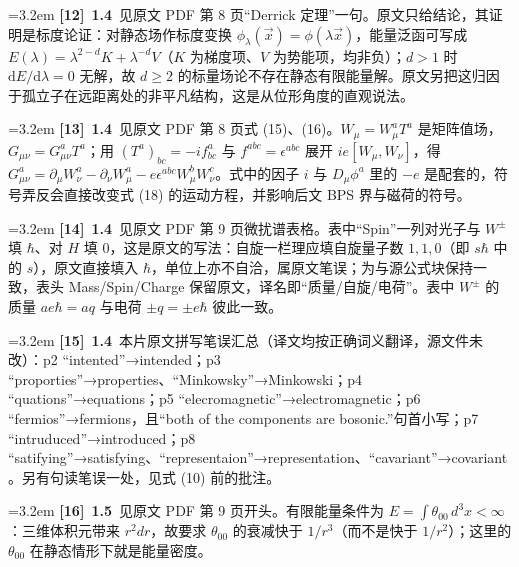 \par
\par\medskip\noindent\hangindent=3.2em \textbf{[12]}~\textbf{1.4}~见原文 PDF 第 8 页“Derrick 定理”一句。原文只给结论，其证明是标度论证：对静态场作标度变换 $\phi_\lambda(\vec{x})=\phi(\lambda\vec{x})$，能量泛函可写成 $E(\lambda)=\lambda^{2-d}K+\lambda^{-d}V$（$K$ 为梯度项、$V$ 为势能项，均非负）；$d>1$ 时 $\mathrm{d}E/\mathrm{d}\lambda=0$ 无解，故 $d\ge2$ 的标量场论不存在静态有限能量解。原文另把这归因于孤立子在远距离处的非平凡结构，这是从位形角度的直观说法。
\par
\par\medskip\noindent\hangindent=3.2em \textbf{[13]}~\textbf{1.4}~见原文 PDF 第 8 页式 (15)、(16)。$W_\mu=W^a_\mu T^a$ 是矩阵值场，$G_{\mu\nu}=G^a_{\mu\nu}T^a$；用 $(T^a)_{bc}=-if^a_{bc}$ 与 $f^{abc}=\epsilon^{abc}$ 展开 $ie[W_\mu,W_\nu]$，得 $G^a_{\mu\nu}=\partial_\mu W^a_\nu-\partial_\nu W^a_\mu-e\epsilon^{abc}W^b_\mu W^c_\nu$。式中的因子 $i$ 与 $D_\mu\phi^a$ 里的 $-e$ 是配套的，符号弄反会直接改变式 (18) 的运动方程，并影响后文 BPS 界与磁荷的符号。
\par
\par\medskip\noindent\hangindent=3.2em \textbf{[14]}~\textbf{1.4}~见原文 PDF 第 9 页微扰谱表格。表中“Spin”一列对光子与 $W^\pm$ 填 $\hbar$、对 $H$ 填 $0$，这是原文的写法：自旋一栏理应填自旋量子数 $1,1,0$（即 $s\hbar$ 中的 $s$），原文直接填入 $\hbar$，单位上亦不自洽，属原文笔误；为与源公式块保持一致，表头 Mass/Spin/Charge 保留原文，译名即“质量/自旋/电荷”。表中 $W^\pm$ 的质量 $ae\hbar=aq$ 与电荷 $\pm q=\pm e\hbar$ 彼此一致。
\par
\par\medskip\noindent\hangindent=3.2em \textbf{[15]}~\textbf{1.4}~本片原文拼写笔误汇总（译文均按正确词义翻译，源文件未改）：p2 “intented”→intended；p3 “proporties”→properties、“Minkowsky”→Minkowski；p4 “quations”→equations；p5 “elecromagnetic”→electromagnetic；p6 “fermios”→fermions，且“both of the components are bosonic.”句首小写；p7 “intruduced”→introduced；p8 “satifying”→satisfying、“representaion”→representation、“cavariant”→covariant。另有句读笔误一处，见式 (10) 前的批注。
\par
\par\medskip\noindent\hangindent=3.2em \textbf{[16]}~\textbf{1.5}~见原文 PDF 第 9 页开头。有限能量条件为 $E=\int\theta_{00}\,d^3x<\infty$：三维体积元带来 $r^2dr$，故要求 $\theta_{00}$ 的衰减快于 $1/r^3$（而不是快于 $1/r^2$）；这里的 $\theta_{00}$ 在静态情形下就是能量密度。
\par
